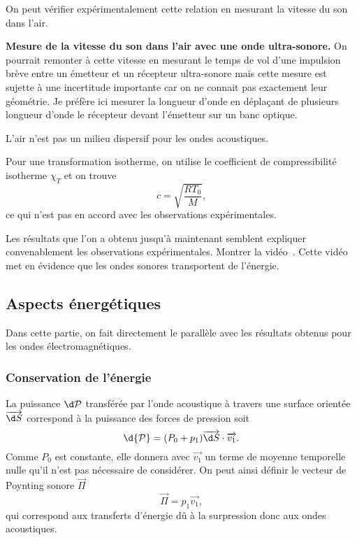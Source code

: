 On peut vérifier expérimentalement cette relation en mesurant la vitesse du son dans l'air.
\begin{experience}
\textbf{Mesure de la vitesse du son dans l'air avec une onde ultra-sonore.}
On pourrait remonter à cette vitesse en mesurant le temps de vol d'une impulsion brève entre un émetteur et un récepteur ultra-sonore mais cette mesure est sujette à une incertitude importante car on ne connait pas exactement leur géométrie.
Je préfère ici mesurer la longueur d'onde en déplaçant de plusieurs longueur d'onde le récepteur devant l'émetteur sur un banc optique.
\end{experience}

\begin{remarque}
L'air n'est pas un milieu dispersif pour les ondes acoustiques.
\end{remarque}
\begin{remarque}
Pour une transformation isotherme, on utilise le coefficient de compressibilité isotherme $\chi_T$ et on trouve
\begin{equation*}
c = \sqrt{\frac{RT_0}{M}},
\end{equation*}
ce qui n'est pas en accord avec les observations expérimentales.
\end{remarque}

\begin{transition}
Les résultats que l'on a obtenu jusqu'à maintenant semblent expliquer convenablement les observations expérimentales.
Montrer la vidéo~\cite{Metzdorff2017}.
Cette vidéo met en évidence que les ondes sonores transportent de l'énergie.
\end{transition}

\subsection{Aspects énergétiques}

Dans cette partie, on fait directement le parallèle avec les résultats obtenus pour les ondes électromagnétiques.

\subsubsection{Conservation de l'énergie}

La puissance $\d\cal{P}$ transférée par l'onde acoustique à travers une surface orientée $\overrightarrow{\d S}$ correspond à la puissance des forces de pression soit
\begin{equation*}
\d {\cal{P}} = (P_0+p_1) \overrightarrow{\d S} \cdot \overrightarrow{v_1}.
\end{equation*}
Comme $P_0$ est constante, elle donnera avec $\overrightarrow{v_1}$ un terme de moyenne temporelle nulle qu'il n'est pas nécessaire de considérer.
On peut ainsi définir le vecteur de Poynting sonore $\overrightarrow{\Pi}$
\begin{equation}
\overrightarrow{\Pi} = p_1\overrightarrow{v_1},
\end{equation}
qui correspond aux transferts d'énergie dû à la surpression donc aux ondes acoustiques.

